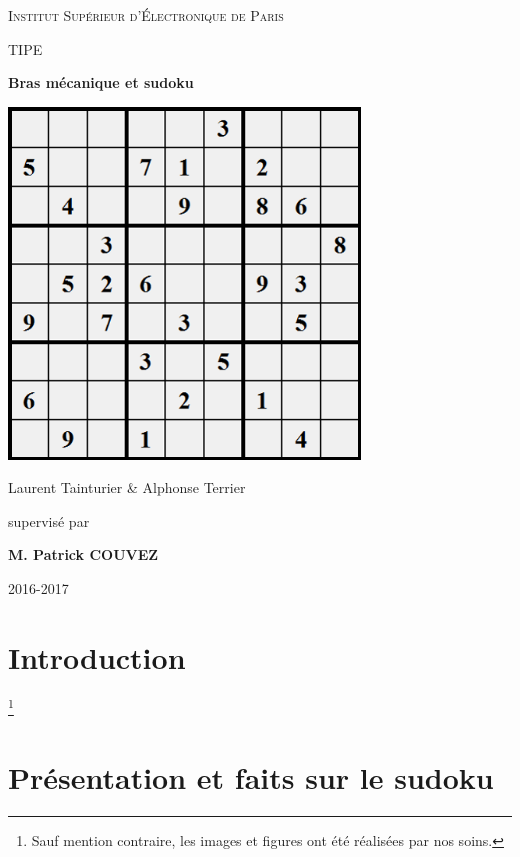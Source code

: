 \documentclass[12pt,a4paper]{report}
\newenvironment{changemargin}[2]{\begin{list}{}{%
\setlength{\topsep}{0pt}%
\setlength{\leftmargin}{0pt}%
\setlength{\rightmargin}{0pt}%
\setlength{\listparindent}{\parindent}%
\setlength{\itemindent}{\parindent}%
\setlength{\parsep}{0pt plus 1pt}%
\addtolength{\leftmargin}{#1}%
\addtolength{\rightmargin}{#2}%
}\item }{\end{list}}
\begin{document}
\FloatBarrier

\begin{titlepage}
\begin{changemargin}{-1cm}{0cm}
	\centering
	\vspace{5cm}
	{\scshape\huge Institut Supérieur d'Électronique de Paris \par}
	\vspace{1cm}
	{\scshape\LARGE TIPE\par}
	\vspace{1.5cm}
	{\fontsize{45}{45}\selectfont\bfseries Bras mécanique et sudoku\par}
	\vspace{2cm}
	\includegraphics[width=0.7\textwidth]{../pictures/pagedegarde.png}\par\vspace{1.5cm}
	{\LARGE Laurent Tainturier \& Alphonse Terrier\par}
	\vfill
	\large supervisé par\par
	\large \bfseries M. Patrick COUVEZ

	\vfill

	{\large 2016-2017}
\end{changemargin}
\end{titlepage}

\tableofcontents
{}
	\chapter*{Introduction}
\footnote{Sauf mention contraire, les images et figures ont été réalisées par nos soins.}
	
	\chapter{Présentation et faits sur le sudoku}
	
\end{document}
